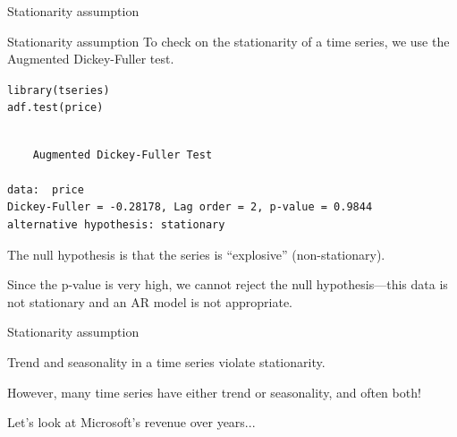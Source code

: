 \documentclass{beamer}\usepackage[]{graphicx}\usepackage[]{color}
\makeatletter
\newcommand{\hlnum}[1]{\textcolor[rgb]{0.824,0.412,0.118}{#1}}%
\newcommand{\hlcom}[1]{\textcolor[rgb]{0.824,0.706,0.549}{#1}}%
\newcommand{\hlopt}[1]{\textcolor[rgb]{1,0.894,0.769}{#1}}%
\newcommand{\hlstd}[1]{\textcolor[rgb]{1,0.894,0.769}{#1}}%
\newcommand{\hlkwb}[1]{\textcolor[rgb]{0.804,0.776,0.451}{#1}}%
\newcommand{\hlkwc}[1]{\textcolor[rgb]{0.78,0.941,0.545}{#1}}%
\newcommand{\hlkwd}[1]{\textcolor[rgb]{1,0.78,0.769}{#1}}%
\newenvironment{kframe}{%
 \def\at@end@of@kframe{}%
 \ifinner\ifhmode%
  \def\at@end@of@kframe{\end{minipage}}%
  \begin{minipage}{\columnwidth}%
 \fi\fi%
 \def\FrameCommand##1{\hskip\@totalleftmargin \hskip-\fboxsep
 \colorbox{shadecolor}{##1}\hskip-\fboxsep
     \hskip-\linewidth \hskip-\@totalleftmargin \hskip\columnwidth}%
 \MakeFramed {\advance\hsize-\width
   \@totalleftmargin\z@ \linewidth\hsize
   \@setminipage}}%
 {\par\unskip\endMakeFramed%
 \at@end@of@kframe}
\newenvironment{knitrout}{}{} %
\makeatother
\begin{document}
\begin{darkframes}
\begin{frame}[fragile]{Stationarity assumption}
    \end{frame}
    
    
    
    \begin{frame}[fragile]{Stationarity assumption}
      \fontsize{9}{9}\selectfont
      To check on the stationarity of a time series, we use the Augmented Dickey-Fuller test.
\begin{knitrout}
\begin{kframe}
\begin{alltt}
\hlkwd{library}\hlstd{(tseries)}
\hlkwd{adf.test}\hlstd{(price)}
\end{alltt}
\begin{verbatim}

	Augmented Dickey-Fuller Test

data:  price
Dickey-Fuller = -0.28178, Lag order = 2, p-value = 0.9844
alternative hypothesis: stationary
\end{verbatim}
\end{kframe}
\end{knitrout}
      \pause
      The null hypothesis is that the series is ``explosive'' (non-stationary). \pause
      
      Since the p-value is very high, we cannot reject the null hypothesis---this data is not stationary and an AR model is not appropriate.
    \end{frame}
      
    
    
    \begin{frame}[fragile]{Stationarity assumption}
      \begin{center}
      Trend and seasonality in a time series violate stationarity. \pause
      \bigskip
      
      However, many time series have either trend or seasonality, and often both! \pause
      \bigskip
      
      Let's look at Microsoft's revenue over years...
      \end{center}
    
    \end{frame}
    
    
    
\end{darkframes}
\end{document}
